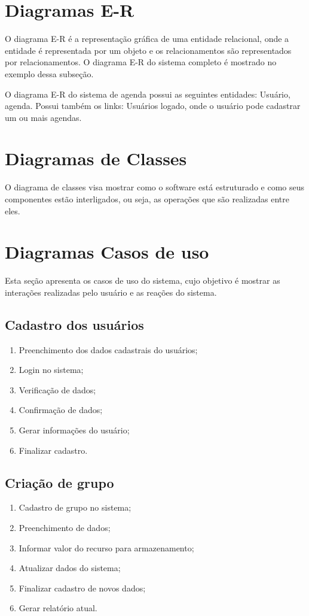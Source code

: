 \section{Diagramas E-R}
O diagrama E-R é a representação gráfica de uma entidade relacional, onde a entidade é representada por um objeto e os relacionamentos são representados por relacionamentos. O diagrama E-R do sistema completo é mostrado no exemplo dessa subseção.

O diagrama E-R do sistema de agenda possui as seguintes entidades: Usuário, agenda. Possui também os links: Usuários logado, onde o usuário pode cadastrar um ou mais agendas.


\section{Diagramas de Classes}
O diagrama de classes visa mostrar como o software está estruturado e como seus componentes estão interligados, ou seja, as operações que são realizadas entre eles.

\section{Diagramas Casos de uso}


Esta seção apresenta os casos de uso do sistema, cujo objetivo é mostrar as interações realizadas pelo usuário e as reações do sistema.


\subsection{Cadastro dos usuários}
\begin{enumerate}
      \item Preenchimento dos dados cadastrais do usuários;
      \item Login no sistema;
      \item Verificação de dados;
      \item Confirmação de dados;
      \item Gerar informações do usuário;
      \item Finalizar cadastro.
\end{enumerate}

\subsection{Criação de grupo}
\begin{enumerate}
      \item Cadastro de grupo no sistema;
      \item Preenchimento de dados;
      \item Informar valor do recurso para armazenamento;
      \item Atualizar dados do sistema;
      \item Finalizar cadastro de novos dados;
      \item Gerar relatório atual.
\end{enumerate}


